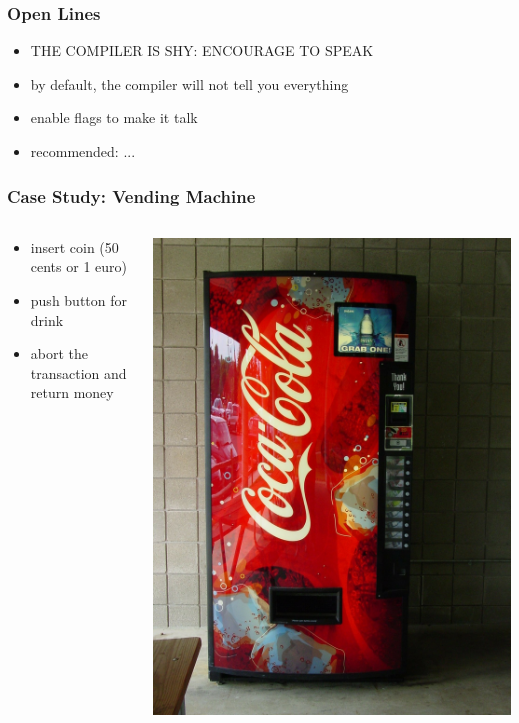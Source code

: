 \documentclass{beamer}
\begin{document}
\begin{frame}
  \frametitle{Open Lines}
  \begin{itemize}
  \item THE COMPILER IS SHY: ENCOURAGE TO SPEAK
  \item by default, the compiler will not tell you everything
  \item enable flags to make it talk
  \item recommended: ...
  \end{itemize}
\end{frame}

\begin{frame}
  \frametitle{Case Study: Vending Machine}
  \begin{columns}
    \begin{column}{0.6\textwidth}
      \begin{itemize}
      \item insert coin (50 cents or 1 euro)
      \item push button for drink
      \item abort the transaction and return money
      \end{itemize}
    \end{column}
    \begin{column}{0.4\textwidth}
      \begin{center}
        \includegraphics[width=\textwidth]{../pics/vending.jpg}
      \end{center}

    \end{column}
  \end{columns}
\end{frame}
\end{document}

